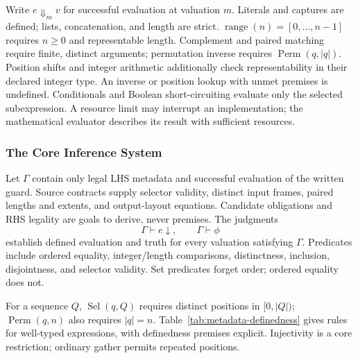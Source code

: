 Write $e\Downarrow_m v$ for successful evaluation at valuation $m$.
Literals and captures are defined; lists, concatenation, and length are strict.
$\operatorname{range}(n)=[0,\ldots,n-1]$ requires $n\ge0$ and representable
length. Complement and paired matching require finite, distinct arguments;
permutation inverse requires $\operatorname{Perm}(q,|q|)$. Position shifts
and integer arithmetic additionally check representability in their declared
integer type. An inverse or position lookup with unmet premises is
undefined. Conditionals and Boolean short-circuiting evaluate only the
selected subexpression. A resource limit may interrupt an implementation;
the mathematical evaluator describes its result with sufficient resources.

\subsubsection{The Core Inference System}
Let $\Gamma$ contain only legal LHS metadata and successful evaluation of
the written guard. Source contracts supply selector validity, distinct
input frames, paired lengths and extents, and output-layout equations.
Candidate obligations and RHS legality are goals to derive, never premises. The judgments
\begin{equation}
 \Gamma\vdash e\downarrow,\qquad \Gamma\vdash\phi
 \label{eq:metadata-judgments}
\end{equation}
establish defined evaluation and truth for every valuation satisfying
$\Gamma$. Predicates include ordered equality, integer/length comparisons,
distinctness, inclusion, disjointness, and selector validity. Set predicates
forget order; ordered equality does not.

For a sequence $Q$, $\operatorname{Sel}(q,Q)$ requires distinct positions
in $[0,|Q|)$; $\operatorname{Perm}(q,n)$ also requires $|q|=n$.
Table~\ref{tab:metadata-definedness} gives rules for well-typed expressions,
with definedness premises explicit. Injectivity is a core restriction;
ordinary gather permits repeated positions.

